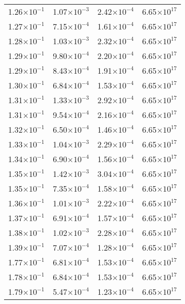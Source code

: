 \documentclass{aa}
\begin{document}
{\begin{longtable}{c|c|c|c}
1.26$\times 10^{-1}$ & 1.07$\times 10^{-3}$ & 2.42$\times 10^{-4}$ & 6.65$\times 10^{17}$  \\
1.27$\times 10^{-1}$ & 7.15$\times 10^{-4}$ & 1.61$\times 10^{-4}$ & 6.65$\times 10^{17}$  \\
1.28$\times 10^{-1}$ & 1.03$\times 10^{-3}$ & 2.32$\times 10^{-4}$ & 6.65$\times 10^{17}$  \\
1.29$\times 10^{-1}$ & 9.80$\times 10^{-4}$ & 2.20$\times 10^{-4}$ & 6.65$\times 10^{17}$  \\
1.29$\times 10^{-1}$ & 8.43$\times 10^{-4}$ & 1.91$\times 10^{-4}$ & 6.65$\times 10^{17}$  \\
1.30$\times 10^{-1}$ & 6.84$\times 10^{-4}$ & 1.53$\times 10^{-4}$ & 6.65$\times 10^{17}$  \\
1.31$\times 10^{-1}$ & 1.33$\times 10^{-3}$ & 2.92$\times 10^{-4}$ & 6.65$\times 10^{17}$  \\
1.31$\times 10^{-1}$ & 9.54$\times 10^{-4}$ & 2.16$\times 10^{-4}$ & 6.65$\times 10^{17}$  \\
1.32$\times 10^{-1}$ & 6.50$\times 10^{-4}$ & 1.46$\times 10^{-4}$ & 6.65$\times 10^{17}$  \\
1.33$\times 10^{-1}$ & 1.04$\times 10^{-3}$ & 2.29$\times 10^{-4}$ & 6.65$\times 10^{17}$  \\
1.34$\times 10^{-1}$ & 6.90$\times 10^{-4}$ & 1.56$\times 10^{-4}$ & 6.65$\times 10^{17}$  \\
1.35$\times 10^{-1}$ & 1.42$\times 10^{-3}$ & 3.04$\times 10^{-4}$ & 6.65$\times 10^{17}$  \\
1.35$\times 10^{-1}$ & 7.35$\times 10^{-4}$ & 1.58$\times 10^{-4}$ & 6.65$\times 10^{17}$  \\
1.36$\times 10^{-1}$ & 1.01$\times 10^{-3}$ & 2.22$\times 10^{-4}$ & 6.65$\times 10^{17}$  \\
1.37$\times 10^{-1}$ & 6.91$\times 10^{-4}$ & 1.57$\times 10^{-4}$ & 6.65$\times 10^{17}$  \\
1.38$\times 10^{-1}$ & 1.02$\times 10^{-3}$ & 2.28$\times 10^{-4}$ & 6.65$\times 10^{17}$  \\
1.39$\times 10^{-1}$ & 7.07$\times 10^{-4}$ & 1.28$\times 10^{-4}$ & 6.65$\times 10^{17}$  \\
1.77$\times 10^{-1}$ & 6.81$\times 10^{-4}$ & 1.53$\times 10^{-4}$ & 6.65$\times 10^{17}$  \\
1.78$\times 10^{-1}$ & 6.84$\times 10^{-4}$ & 1.53$\times 10^{-4}$ & 6.65$\times 10^{17}$  \\
1.79$\times 10^{-1}$ & 5.47$\times 10^{-4}$ & 1.23$\times 10^{-4}$ & 6.65$\times 10^{17}$  \\

\end{longtable}}
\end{document}
